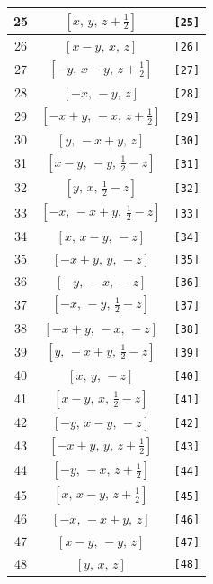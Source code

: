 \documentclass[fleqn,8pt]{jsarticle}
\begin{document}
\begin{longtable}{ccc}
25 & $\left[ x,\, y,\, z + \frac{1}{2} \right]$ & {\tt [25]} \\ \hline
26 & $\left[ x - y,\, x,\, z \right]$ & {\tt [26]} \\ \hline
27 & $\left[ - y,\, x - y,\, z + \frac{1}{2} \right]$ & {\tt [27]} \\ \hline
28 & $\left[ - x,\, - y,\, z \right]$ & {\tt [28]} \\ \hline
29 & $\left[ - x + y,\, - x,\, z + \frac{1}{2} \right]$ & {\tt [29]} \\ \hline
30 & $\left[ y,\, - x + y,\, z \right]$ & {\tt [30]} \\ \hline
31 & $\left[ x - y,\, - y,\, \frac{1}{2} - z \right]$ & {\tt [31]} \\ \hline
32 & $\left[ y,\, x,\, \frac{1}{2} - z \right]$ & {\tt [32]} \\ \hline
33 & $\left[ - x,\, - x + y,\, \frac{1}{2} - z \right]$ & {\tt [33]} \\ \hline
34 & $\left[ x,\, x - y,\, - z \right]$ & {\tt [34]} \\ \hline
35 & $\left[ - x + y,\, y,\, - z \right]$ & {\tt [35]} \\ \hline
36 & $\left[ - y,\, - x,\, - z \right]$ & {\tt [36]} \\ \hline
37 & $\left[ - x,\, - y,\, \frac{1}{2} - z \right]$ & {\tt [37]} \\ \hline
38 & $\left[ - x + y,\, - x,\, - z \right]$ & {\tt [38]} \\ \hline
39 & $\left[ y,\, - x + y,\, \frac{1}{2} - z \right]$ & {\tt [39]} \\ \hline
40 & $\left[ x,\, y,\, - z \right]$ & {\tt [40]} \\ \hline
41 & $\left[ x - y,\, x,\, \frac{1}{2} - z \right]$ & {\tt [41]} \\ \hline
42 & $\left[ - y,\, x - y,\, - z \right]$ & {\tt [42]} \\ \hline
43 & $\left[ - x + y,\, y,\, z + \frac{1}{2} \right]$ & {\tt [43]} \\ \hline
44 & $\left[ - y,\, - x,\, z + \frac{1}{2} \right]$ & {\tt [44]} \\ \hline
45 & $\left[ x,\, x - y,\, z + \frac{1}{2} \right]$ & {\tt [45]} \\ \hline
46 & $\left[ - x,\, - x + y,\, z \right]$ & {\tt [46]} \\ \hline
47 & $\left[ x - y,\, - y,\, z \right]$ & {\tt [47]} \\ \hline
48 & $\left[ y,\, x,\, z \right]$ & {\tt [48]} \\
\end{longtable}
\end{document}
